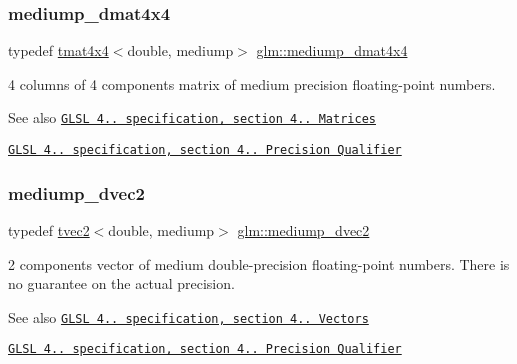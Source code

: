 \subsubsection{\texorpdfstring{mediump\+\_\+dmat4x4}{mediump\_dmat4x4}}
{\footnotesize\ttfamily typedef \hyperlink{structglm_1_1tmat4x4}{tmat4x4}$<$double, mediump$>$ \hyperlink{group__core__precision_ga6dc4057e30931ebd0b5d7e44ef27763a}{glm\+::mediump\+\_\+dmat4x4}}

4 columns of 4 components matrix of medium precision floating-\/point numbers.

\begin{DoxySeeAlso}{See also}
\href{http://www.opengl.org/registry/doc/GLSLangSpec.4.20.8.pdf}{\tt G\+L\+SL 4.. specification, section 4.. Matrices} 

\href{http://www.opengl.org/registry/doc/GLSLangSpec.4.20.8.pdf}{\tt G\+L\+SL 4.. specification, section 4.. Precision Qualifier} 
\end{DoxySeeAlso}
\mbox{\label{group__core__precision_gafc1ed63d5e5d1ddcf67752143f4f5871}} 
\subsubsection{\texorpdfstring{mediump\+\_\+dvec2}{mediump\_dvec2}}
{\footnotesize\ttfamily typedef \hyperlink{structglm_1_1tvec2}{tvec2}$<$double, mediump$>$ \hyperlink{group__core__precision_gafc1ed63d5e5d1ddcf67752143f4f5871}{glm\+::mediump\+\_\+dvec2}}

2 components vector of medium double-\/precision floating-\/point numbers. There is no guarantee on the actual precision.

\begin{DoxySeeAlso}{See also}
\href{http://www.opengl.org/registry/doc/GLSLangSpec.4.20.8.pdf}{\tt G\+L\+SL 4.. specification, section 4.. Vectors} 

\href{http://www.opengl.org/registry/doc/GLSLangSpec.4.20.8.pdf}{\tt G\+L\+SL 4.. specification, section 4.. Precision Qualifier} 
\end{DoxySeeAlso}
\mbox{\label{group__core__precision_ga4f6942e5a5c9f5dc5a0e1eed980d2ecd}} 
